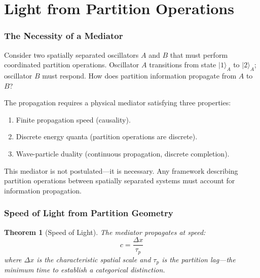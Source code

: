 \documentclass[twocolumn,10pt,a4paper]{article}
\theoremstyle{plain}
\newtheorem{theorem}{Theorem}[section]
\theoremstyle{definition}
\theoremstyle{remark}
\newcommand{\taup}{\tau_p}
\begin{document}

\part{Light from Partition Operations}
\label{part:light}

\section{The Necessity of a Mediator}
\label{sec:mediator}

Consider two spatially separated oscillators $A$ and $B$ that must perform coordinated partition operations. Oscillator $A$ transitions from state $|1\rangle_A$ to $|2\rangle_A$; oscillator $B$ must respond. How does partition information propagate from $A$ to $B$?

The propagation requires a physical mediator satisfying three properties:
\begin{enumerate}
    \item Finite propagation speed (causality).
    \item Discrete energy quanta (partition operations are discrete).
    \item Wave-particle duality (continuous propagation, discrete completion).
\end{enumerate}

This mediator is not postulated---it is necessary. Any framework describing partition operations between spatially separated systems must account for information propagation.

\section{Speed of Light from Partition Geometry}
\label{sec:speed_of_light}

\begin{theorem}[Speed of Light]
\label{thm:speed_of_light}
The mediator propagates at speed:
\begin{equation}
\boxed{c = \frac{\Delta x}{\taup}}
\end{equation}
where $\Delta x$ is the characteristic spatial scale and $\taup$ is the partition lag---the minimum time to establish a categorical distinction.
\end{theorem}
\end{document}
